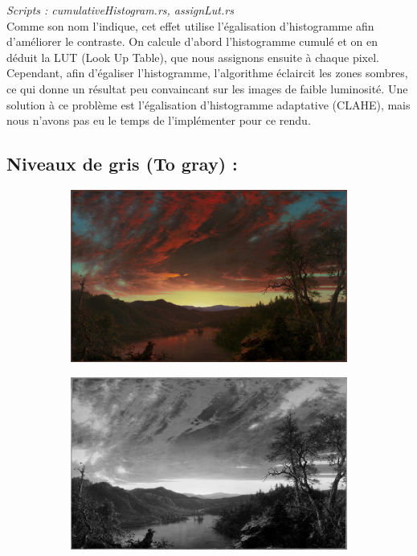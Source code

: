 \emph{Scripts : cumulativeHistogram.rs, assignLut.rs} 
\\

Comme son nom l'indique, cet effet utilise l'égalisation d'histogramme afin d'améliorer le contraste.
On calcule d'abord l'histogramme cumulé et on en déduit la LUT (Look Up Table), que nous assignons ensuite à chaque pixel.
\\

Cependant, afin d'égaliser l'histogramme, l'algorithme éclaircit les zones sombres, ce qui donne un résultat peu convaincant sur les images de faible luminosité.
Une solution à ce problème est l'égalisation d'histogramme adaptative (CLAHE), mais nous n'avons pas eu le temps de l'implémenter pour ce rendu.
\\

\subsection{Niveaux de gris (To gray) :}

\begin{figure}[!h]
    \centering
    \begin{subfigure}[b]{0.3\textwidth}
        \includegraphics[width=1\textwidth]{report_src/effects/original1.jpeg}
    \end{subfigure}
    \begin{subfigure}[b]{0.3\textwidth}
        \includegraphics[width=1\textwidth]{report_src/effects/to_gray.jpeg}
    \end{subfigure}
\end{figure} 

